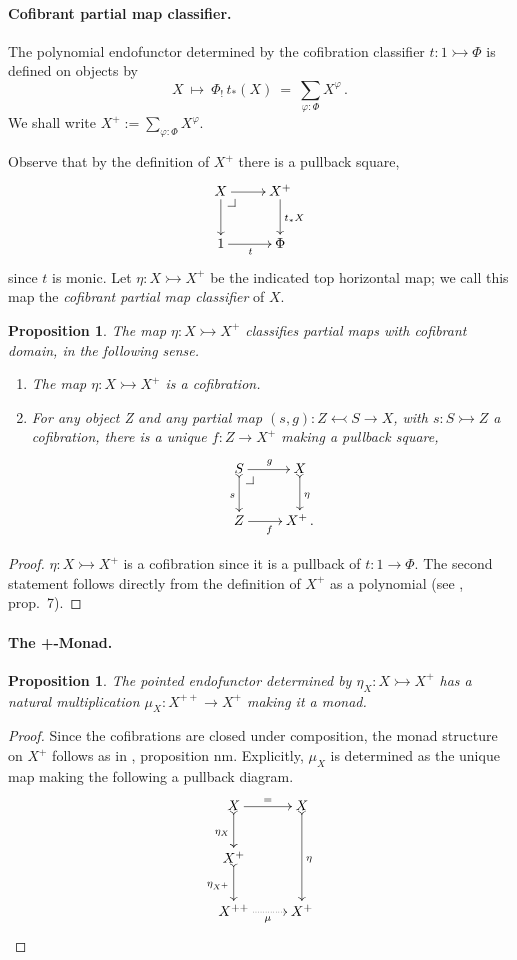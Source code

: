 \documentclass[11pt]{article}
\makeatletter
\newcommand{\pbcorner}[1][dr]{\save*!/#1-1.2pc/#1:(-1,1)@^{|-}\restore}
\newcommand{\mono}{\ensuremath{\rightarrowtail}}
\newcommand{\ra}{\ensuremath{\rightarrow}}
\newtheorem{proposition}[theorem]{Proposition}
\theoremstyle{remark}
\theoremstyle{definition}
\makeatother
\begin{document}
\paragraph{Cofibrant partial map classifier.}
The polynomial endofunctor \cite{GG} determined by the cofibration classifier $t : 1 \mono \Phi$ is defined on objects by
\[
X\ \mapsto\ \Phi_!\,t_*(X)\ =\ \sum_{\varphi: \Phi}X^{\varphi}\,.
\]
We shall write $X^+ := \sum_{\varphi: \Phi}X^{\varphi}$.

Observe that by the definition of $X^+$ there is a pullback square,
\[
\xymatrix{
X \ar[d]\pbcorner \ar[r] & X^+ \ar[d]^{t_*X}\\
1 \ar[r]_{t} & \Phi
}
\]
since $t$ is monic. Let $\eta : X\mono X^+$ be the indicated top horizontal map; we call this map the \emph{cofibrant partial map classifier} of $X$.
 
\begin{proposition}
The map $\eta : X\mono X^+$ classifies partial maps with cofibrant domain, in the following sense.
\begin{enumerate}
\item The map $\eta : X\mono X^+$ is a cofibration.
\item For any object Z and any partial map $(s,g): Z\leftarrowtail S\ra X$, with $s : S\mono Z$ a cofibration, there is a unique $f:Z\ra X^+$ making a pullback square,
\[
\xymatrix{
S \ar@{>->}[d]_{s} \pbcorner \ar[r]^g & X \ar@{>->}[d]^{\eta}\\
Z \ar[r]_f & X^+\,.
}
\]
\end{enumerate}
\end{proposition}

\begin{proof}
$\eta : X\mono X^+$ is a cofibration since it is a pullback of $t : 1\to \Phi$. The second statement follows directly from the definition of $X^+$ as a polynomial (see \cite{A:NM}, prop.~7). 
\end{proof}

\paragraph{The +-Monad.}

\begin{proposition}
The pointed endofunctor determined by $\eta_X : X\mono X^+$ has a natural multiplication $\mu_X : X^{++} \to X^+$ making it a monad.
\end{proposition}

\begin{proof}
Since the cofibrations are closed under composition, the monad structure on $X^+$ follows as in \cite{AN}, proposition nm.  Explicitly, $\mu_X$ is determined as the unique map making the following a pullback diagram.
\[
\xymatrix{
X \ar@{>->}[d]_{\eta_X} \ar[r]^= & X \ar@{>->}[dd]^{\eta}\\
X^+ \ar@{>->}[d]_{\eta_{X^+}} & \\
X^{++} \ar@{.>}[r]_\mu & X^+
}
\]
\end{proof}
\end{document}
